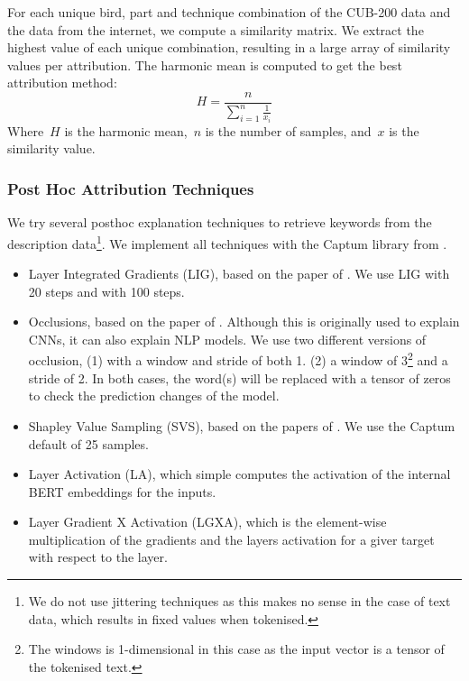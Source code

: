 \documentclass[a4paper, 12pt, oneside]{book} %
\begin{document}
For each unique bird, part and technique combination of the CUB-200 data and the data from the internet, we compute a similarity matrix.
We extract the highest value of each unique combination, resulting in a large array of similarity values per attribution.
The harmonic mean is computed to get the best attribution method:
\begin{equation}
    H = \frac{n}{\sum\limits_{i=1}^n \frac1{x_i}}
\end{equation}
Where~$H$ is the harmonic mean,~$n$ is the number of samples, and~$x$ is the similarity value. 

\subsubsection{Post Hoc Attribution Techniques} \label{par:attribution}
We try several posthoc explanation techniques to retrieve keywords from the description data\footnote{We do not use jittering techniques as this makes no sense in the case of text data, which results in fixed values when tokenised.}. 
We implement all techniques with the Captum library from \textcite{kokhlikyan_captum_2020}.
\begin{itemize}
    \item Layer Integrated Gradients (LIG), based on the paper of \textcite{sundararajan_axiomatic_2017}. We use LIG with 20 steps and with 100 steps.
    \item Occlusions, based on the paper of \textcite{fleet_visualizing_2014}. Although this is originally used to explain CNNs, it can also explain NLP models. We use two different versions of occlusion, (1) with a window and stride of both 1. (2) a window of 3\footnote{The windows is 1-dimensional in this case as the input vector is a tensor of the tokenised text.} and a stride of 2. In both cases, the word(s) will be replaced with a tensor of zeros to check the prediction changes of the model. 
    \item Shapley Value Sampling (SVS), based on the papers of \textcite{castro_polynomial_2009, strumbelj_efficient_2010}. We use the Captum default of 25 samples.
    \item Layer Activation (LA), which simple computes the activation of the internal BERT embeddings for the inputs.
    \item Layer Gradient X Activation (LGXA), which is the element-wise multiplication of the gradients and the layers activation for a giver target with respect to the layer.
\end{itemize}
\end{document}
